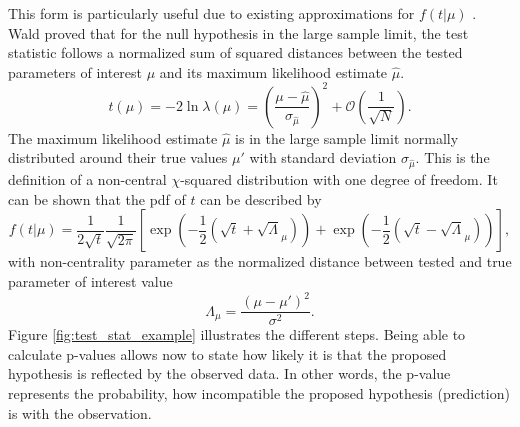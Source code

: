 This form is particularly useful due to existing approximations for $f(t | \mu)$ \citep{cowan2011asymptotic}. Wald \citep{wilks1938large} proved that for the null hypothesis in the large sample limit, the test statistic follows a normalized sum of squared distances between the tested parameters of interest $\mu$ and its maximum likelihood estimate $\hat{\mu}$. 
\begin{equation}
    t(\mu)=-2\ln \lambda(\mu)=
     \left(\frac{\mu-\hat{\mu}}{\sigma_{\hat{\mu}}} \right)^2
    + \mathcal{O}(\frac{1}{\sqrt{N}}).
\end{equation}
The maximum likelihood estimate $\hat{\mu}$ is in the large sample limit normally distributed around their true values $\mu'$ with standard deviation $\sigma_{\hat{\mu}}$. This is the definition of a non-central $\chi$-squared distribution with one degree of freedom. It can be shown that the \ac{pdf} of $t$ can be described by 
\begin{equation}\label{eq:chi-square}
    f(t | \mu)=\frac{1}{2\sqrt{t}}\frac{1}{\sqrt{2\pi}}
    \left[
\exp\left(-\frac{1}{2}\left(\sqrt{t}+\sqrt{\Lambda}_\mu\right)\right)
+
\exp\left(-\frac{1}{2}\left(\sqrt{t}-\sqrt{\Lambda}_\mu\right)\right)
\right],
\end{equation}
with non-centrality parameter as the normalized distance between tested and
true parameter of interest value
\begin{equation}
    \Lambda_\mu=\frac{(\mu-\mu')^2}{\sigma^2}.
\end{equation}
Figure \ref{fig:test_stat_example} illustrates the different steps. Being able to calculate p-values allows now to state how likely it is that the proposed hypothesis is reflected by the observed data. In other words, the p-value represents the probability, how incompatible the proposed hypothesis (prediction) is with the observation.

